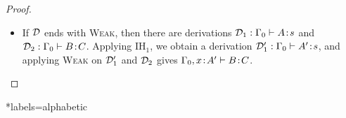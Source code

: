 \documentclass[reqno, twoside]{article}
\begin{document}
\begin{proof}
\begin{itemize}
                \vspace{-0.05in}
            \item If $\mathcal{D}$ ends with \textsc{Weak}, then there are derivations $\mathcal{D}_1:\Gamma_0\vdash A\!:\!s$ and $\mathcal{D}_2:\Gamma_0\vdash B\!:\!C$. Applying $\mathrm{IH}_1$, we obtain a derivation $\mathcal{D}_1':\Gamma_0\vdash A'\!:\!s$, and applying \textsc{Weak} on $\mathcal{D}_1'$ and $\mathcal{D}_2$ gives $\Gamma_0,x\!:\!A'\vdash B\!:\!C$.
        \end{itemize}\vspace{-0.25in}
    \end{proof}

    \appendix

    \begin{bibdiv}
        \begin{biblist}*{labels={alphabetic}}
        \end{biblist}
    \end{bibdiv}
\end{document}
